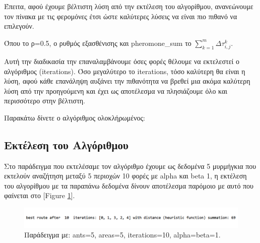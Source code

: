 Έπειτα, αφού έχουμε βέλτιστη λύση από την εκτέλεση του αλγορίθμου, ανανεώνουμε τον πίνακα με τις φερομόνες έτσι ώστε καλύτερες λύσεις να είναι πιο πιθανό να επιλεγούν.

Όπου το ρ=0.5, ο ρυθμός εξασθένισης και pheromone\_sum το $\sum_{k=1}^{m}{Δτ^k_{i,j}}$. 


Αυτή την διαδικασία την επαναλαμβάνουμε όσες φορές θέλουμε να εκτελεστεί ο αλγόριθμος (iterations). Όσο μεγαλύτερο το iterations, τόσο καλύτερη θα είναι η λύση, αφού κάθε επανάληψη αυξάνει την πιθανότητα να βρεθεί μια ακόμα καλύτερη λύση από την προηγούμενη και έχει ως αποτέλεσμα να πλησιάζουμε όλο και περισσότερο στην βέλτιστη.


Παρακάτω δίνετε ο αλγόριθμος ολοκλήρωμένος:




\subsection{Εκτέλεση του Αλγόριθμου}
Στο παράδειγμα που εκτελέσαμε τον αλγόριθμο έχουμε ως δεδομένα 5 μυρμήγκια που εκτελούν αναζήτηση μεταξύ 5 περιοχών 10 φορές με alpha και beta 1, η εκτέλεση του αλγορίθμου με τα παραπάνω δεδομένα δίνουν αποτέλεσμα παρόμοιο με αυτό που φαίνεται στο [Figure \ref{12}].

\begin{figure}
    \centering
    \includegraphics[scale=0.55]{2947_thesis/pictures/ex1.png} 
    \caption{Παράδειγμα με: ants=5, areas=5, iterations=10, alpha=beta=1.}
    \label{12}
\end{figure}

